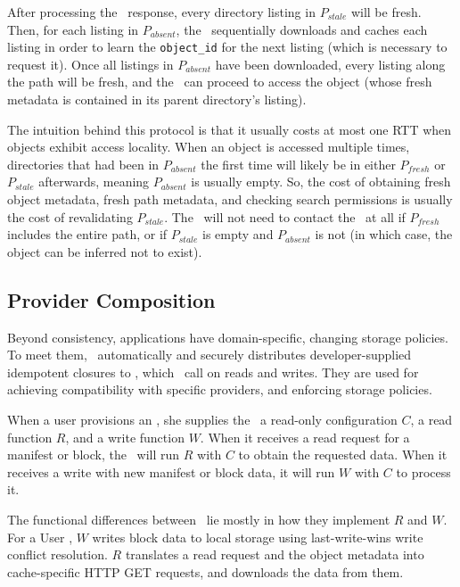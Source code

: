 After processing the \MS\ response, every directory listing in $P_{stale}$
will be fresh.  Then, for each listing in $P_{absent}$, the \SG\ sequentially downloads
and caches each listing in order to learn the {\tt object\_id} for the next listing (which 
is necessary to request it).  Once all listings in $P_{absent}$ have 
been downloaded, every listing along the path will be fresh,
and the \SG\ can proceed to access the object (whose fresh metadata is contained
in its parent directory's listing).

The intuition behind this protocol is that it usually costs at most
one RTT when objects exhibit access locality.
When an object is accessed multiple times,
directories that had been in $P_{absent}$ the first time will likely 
be in either $P_{fresh}$ or $P_{stale}$ afterwards, meaning
$P_{absent}$ is usually empty.  So, the cost of obtaining fresh 
object metadata, fresh path metadata, and checking search permissions
is usually the cost of revalidating $P_{stale}$.  The \SG\ will
not need to contact the \MS\ at all if
$P_{fresh}$ includes the entire path, or 
if $P_{stale}$ is empty and $P_{absent}$ is not (in which case, the 
object can be inferred not to exist).

\subsection{Provider Composition}
\label{sec:composition}


Beyond consistency, applications have domain-specific,
changing storage policies.
To meet them, \Syndicate\ automatically and securely
distributes developer-supplied idempotent closures to \SGs,
which \SGs\ call on reads and writes.
They are used for achieving compatibility with specific 
providers, and enforcing storage policies.

When a user provisions an \SG, she supplies the \MS\ a read-only configuration
$C$, a read function $R$, and a write 
function $W$.  When it receives a read request for a manifest or block, the
\SG\ will run $R$ with $C$ to obtain the requested data.
When it receives a write with new manifest or 
block data, it will run $W$ with $C$ to process it.

The functional differences between \SGs\ lie mostly in how they implement $R$
and $W$.  For a User \SG, $W$ writes block data to local storage
using last-write-wins write conflict resolution.
$R$ translates a read request and the object metadata
into cache-specific HTTP GET requests, and downloads 
the data from them.

